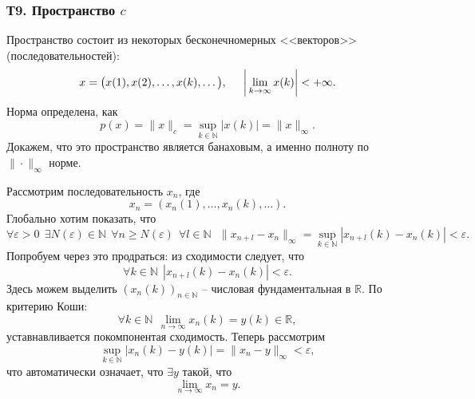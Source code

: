 
\subsubsection*{Т9. Пространство \texorpdfstring{$c$}{с}}

Пространство состоит из некоторых бесконечномерных <<векторов>>  (последовательностей):
\begin{equation*}
    x = \big(x(1), x(2), \ldots, x(k), \ldots\big),
    \hspace{5 mm}
    \bigg|
        \lim_{k \to \infty} x(k)
    \bigg| < + \infty.
\end{equation*}
Норма определена, как
\begin{equation*}
    p(x) = \|x\|_c = \sup_{k \in \mathbb{N}} |x(k)| = \|x\|_{\infty}.
\end{equation*}
Докажем, что это пространство является банаховым, а именно полноту по $\|\cdot\|_{\infty}$ норме. 

Рассмотрим последовательность $x_n$, где 
\begin{equation*}
    x_n = (x_n (1), \ldots, x_n(k), \ldots).
\end{equation*}
Глобально хотим показать, что
\begin{equation*}
    \forall \varepsilon > 0 \ \ 
    \exists N(\varepsilon) \in \mathbb{N} \ \ 
    \forall n \geq N(\varepsilon) \ \ 
    \forall l \in \mathbb{N} \ \  \ 
    \|x_{n+l} -x_{n}\|_{\infty} = \sup_{k \in \mathbb{N}} |x_{n+l} (k) - x_n (k)| < \varepsilon.
\end{equation*}
Попробуем через это продраться: из сходимости следует, что
\begin{equation*}
    \forall k \in \mathbb{N} \ \ |x_{n+l} (k) - x_n (k) | < \varepsilon.
\end{equation*}
Здесь можем выделить $(x_n(k))_{n \in \mathbb{N}}$ -- числовая фундаментальная в $\mathbb{R}$. 
По критерию Коши:
\begin{equation*}
    \forall k \in \mathbb{N} \ \ 
    \lim_{n \to \infty} x_n (k) = y(k) \in \mathbb{R},
\end{equation*}
уставнавливается покомпонентая сходимость. 
Теперь рассмотрим
\begin{equation*}
    \sup_{k\in \mathbb{N}} |x_n (k) - y(k)| = \|x_n - y\|_{\infty} < \varepsilon,
\end{equation*}
что автоматически означает, что $\exists y$ такой, что
\begin{equation*}
    \lim_{n \to \infty} x_n  = y.
\end{equation*}

